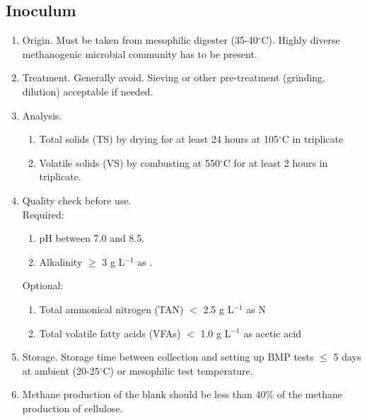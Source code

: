 \documentclass[]{article}
\begin{document}
\subsection{Inoculum}
\begin{enumerate}
  \item Origin. Must be taken from mesophilic digester (35-40$^\circ$C). Highly diverse methanogenic microbial community has to be present.
  \item Treatment. Generally avoid. Sieving or other pre-treatment (grinding, dilution) acceptable if needed.
  \item Analysis.
    \begin{enumerate}
      \item Total solids (TS) by drying for at least 24 hours at 105$^\circ$C in triplicate
      \item Volatile solids (VS) by combusting at 550$^\circ$C for at least 2 hours in triplicate.
    \end{enumerate}
  \item Quality check before use.\\
    Required:
    \begin{enumerate}
      \item pH between 7.0 and 8.5.
      \item Alkalinity $\ge$ 3 g L$^{-1}$ as .
    \end{enumerate}

    Optional:
    \begin{enumerate}
      \item Total ammonical nitrogen (TAN) $<$ 2.5 g L$^{-1}$ as N
      \item Total volatile fatty acids (VFAs) $<$ 1.0 g L$^{-1}$ as acetic acid
    \end{enumerate}
  \item Storage. Storage time between collection and setting up BMP tests $\le$ 5 days at ambient (20-25$^\circ$C) or mesophilic test temperature.
  \item Methane production of the blank should be less than 40\% of the methane production of cellulose. 
\end{enumerate}
\end{document}

